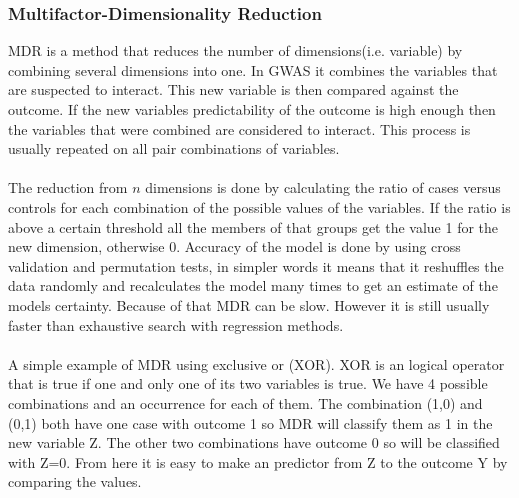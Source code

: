 \documentclass[10pt,a4paper]{report}
\newcounter{example}
\begin{document}
\subsubsection{Multifactor-Dimensionality Reduction}
MDR is a method that reduces the number of dimensions(i.e. variable) by combining several dimensions into one. In GWAS it combines the variables that are suspected to interact. This new variable is then compared against the outcome. If the new variables predictability of the outcome is high enough then the variables that were combined are considered to interact. This process is usually repeated on all pair combinations of variables.\\
\\
The reduction from $n$ dimensions is done by calculating the ratio of cases versus controls for each combination of the possible values of the variables. If the ratio is above a certain threshold all the members of that groups get the value 1 for the new dimension, otherwise 0. Accuracy of the model is done by using cross validation and permutation tests, in simpler words it means that it reshuffles the data randomly and recalculates the model many times to get an estimate of the models certainty. Because of that MDR can be slow. However it is still usually faster than exhaustive search with regression methods.\cite{cordell_detect_review,mdr_2001}\\
\\
A simple example of MDR using exclusive or (XOR). XOR is an logical operator that is true if one and only one of its two variables is true. We have 4 possible combinations and an occurrence for each of them. The combination (1,0) and (0,1) both have one case with outcome 1 so MDR will classify them as 1 in the new variable Z. The other two combinations have outcome 0 so will be classified with Z=0. From here it is easy to make an predictor from Z to the outcome Y by comparing the values.
\end{document}
